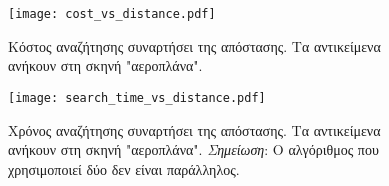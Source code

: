 \begin{figure}[H]
    \centering
    \texttt{[image: cost\_vs\_distance.pdf]}
    \caption[Κόστος Αναζήτησης Συναρτήσει της Απόστασης"] {
        Κόστος αναζήτησης συναρτήσει της απόστασης.
        Τα αντικείμενα ανήκουν στη σκηνή "αεροπλάνα".
    }
    \label{fig:cost_metric_vs_distance}
\end{figure}

\begin{figure}[H]
    \centering
    \texttt{[image: search\_time\_vs\_distance.pdf]}
    \caption[Χρόνος Αναζήτησης Συναρτήσει της Απόστασης"] {
        Χρόνος αναζήτησης συναρτήσει της απόστασης.
        Τα αντικείμενα ανήκουν στη σκηνή "αεροπλάνα".
        \textit{Σημείωση}: Ο αλγόριθμος που χρησιμοποιεί δύο  δεν 
        είναι παράλληλος.
    }
    \label{fig:search_time_vs_distance}
\end{figure}




